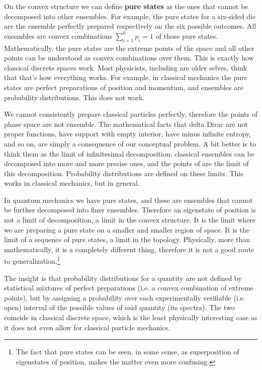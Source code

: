 \documentclass[10pt,twocolumn, nofootinbib]{revtex4-2}
\begin{document}
On the convex structure we can define \textbf{pure states} as the ones that cannot be decomposed into other ensembles. For example, the pure states for a six-sided die are the ensemble perfectly prepared respectively on the six possible outcomes. All ensembles are convex combinations $\sum_{i+1}^{6} p_i = 1$ of those pure states. Mathematically, the pure states are the extreme points of the space and all other points can be understood as convex combinations over them. This is exactly how classical discrete spaces work. Most physicists, including are older selves, think that that's how everything works. For example, in classical mechanics the pure states are perfect preparations of position and momentum, and ensembles are probability distributions. This does not work.

We cannot consistently prepare classical particles perfectly, therefore the points of phase space are not ensemble. The mathematical facts that delta Dirac are not proper functions, have support with empty interior, have minus infinite entropy, and so on, are simply a consequence of our conceptual problem. A bit better is to think them as the limit of infinitesimal decomposition: classical ensembles can be decomposed into more and more precise ones, and the points of are the limit of this decomposition. Probability distributions are defined on these limits. This works in classical mechanics, but in general.

In quantum mechanics we have pure states, and these are ensembles that cannot be further decomposed into finer ensembles. Therefore an eigenstate of position is not a limit of decomposition, a limit in the convex structure. It is the limit where we are preparing a pure state on a smaller and smaller region of space. It is the limit of a sequence of pure states, a limit in the topology. Physically, more than mathematically, it is a completely different thing, therefore it is not a good route to generalization.\footnote{The fact that pure states can be seen, in some sense, as superposition of eigenstates of position, makes the matter even more confusing.}

The insight is that probability distributions for a quantity are not defined by statistical mixtures of perfect preparations (i.e. a convex combination of extreme points), but by assigning a probability over each experimentally verifiable (i.e. open) interval of the possible values of said quantity (its spectra). The two coincide in classical discrete space, which is the least physically interesting case as it does not even allow for classical particle mechanics. 
\end{document}
